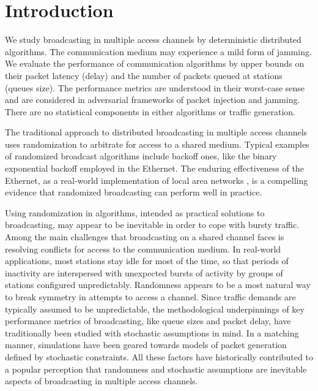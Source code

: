\documentclass[11pt]{article}
\begin{document}
\setcounter{page}{0}

\newpage

\section{Introduction}
\label{sec:introduction}


We study broadcasting in multiple access channels by deterministic distributed algorithms.
The communication medium may experience a mild form of jamming.
We evaluate the performance of communication algorithms by upper bounds on their packet latency (delay) and the number of packets queued at stations (queues size).
The performance metrics are understood in their worst-case sense and are considered in  adversarial frameworks of  packet injection and jamming.
There are no statistical components in either algorithms or traffic generation. 

The traditional approach to distributed broadcasting in multiple access channels uses randomization to arbitrate for access to a shared medium.
Typical examples of randomized broadcast algorithms include backoff ones, like the binary exponential backoff employed in the Ethernet.
The enduring effectiveness of the Ethernet, as a real-world implementation of local area networks \cite{MetcalfeB76}, is a compelling evidence that randomized broadcasting can perform well in practice.

Using randomization in algorithms, intended as practical solutions to broadcasting, may appear to be inevitable in order to cope with bursty traffic.
Among the main challenges that broadcasting on a shared channel faces is resolving conflicts for access to the communication medium.
In real-world applications, most stations stay idle for most of the time, so that periods of inactivity are interspersed with unexpected bursts of activity by groups of stations configured unpredictably.
Randomness appears to be a most natural way to break symmetry in attempts to access a channel.
Since traffic demands are typically assumed to be unpredictable, the methodological underpinnings of key performance metrics of broadcasting, like queue sizes and packet delay, have traditionally been studied with stochastic assumptions in mind.
In a matching manner, simulations have been geared towards models of packet generation defined by stochastic constraints.
All these factors have historically contributed to a popular perception that randomness and stochastic assumptions are inevitable aspects of broadcasting in multiple access channels. 
\end{document}
